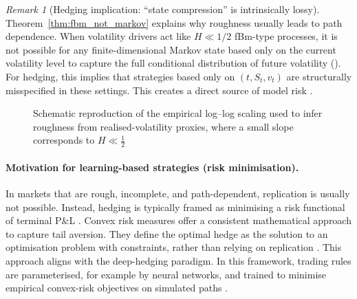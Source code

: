 \documentclass[12pt,a4paper]{article}
\theoremstyle{definition}
\theoremstyle{plain}
\theoremstyle{remark}
\newtheorem{remark}{Remark}[section]
\theoremstyle{plain}
\begin{document}
\begin{remark}[Hedging implication: ``state compression'' is intrinsically lossy]\label{rem:state_compression_lossy}
Theorem~\ref{thm:fbm_not_markov} explains why roughness usually leads to path dependence. When volatility drivers act like $H\ll 1/2$ fBm-type processes, it is not possible for any finite-dimensional Markov state based only on the current volatility level to capture the full conditional distribution of future volatility (\cite{GatheralRough,BayerFriz2016}).
For hedging, this implies that strategies based only on $(t,S_t,v_t)$ are structurally misspecified in these settings. This creates a direct source of model risk \cite{Heston1993,GatheralRough,FoellmerSchied2016}.
\end{remark}

\begin{figure}[H]
\centering
{}
\caption{Schematic reproduction of the empirical log--log scaling used to infer roughness from realised-volatility proxies, where a small slope corresponds to $H\ll \tfrac{1}{2}$ \cite{GatheralRough}}
\label{fig:roughness_scaling_schematic}
\end{figure}
\FloatBarrier

\paragraph{Motivation for learning-based strategies (risk minimisation).}
In markets that are rough, incomplete, and path-dependent, replication is usually not possible. Instead, hedging is typically framed as minimising a risk functional of terminal P\&L \cite{FoellmerSchied2016}.
Convex risk measures offer a consistent mathematical approach to capture tail aversion. They define the optimal hedge as the solution to an optimisation problem with constraints, rather than relying on replication \cite{FoellmerSchied2016,Buehler2019DeepHedging}.
This approach aligns with the deep-hedging paradigm. In this framework, trading rules are parameterised, for example by neural networks, and trained to minimise empirical convex-risk objectives on simulated paths \cite{Buehler2019DeepHedging}.
\end{document}
